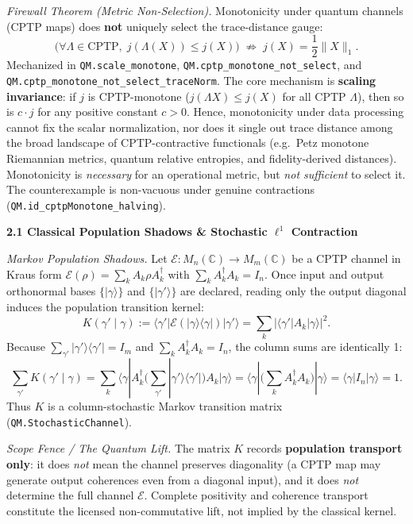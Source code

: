 \documentclass[
  11pt,
]{article}
\begin{document}
\emph{Firewall Theorem (Metric Non-Selection).} Monotonicity under quantum channels (CPTP maps) does \textbf{not} uniquely select the trace-distance gauge:
\[ \big(\forall \Lambda \in \mathrm{CPTP},\; j(\Lambda(X)) \le j(X)\big) \;\not\Longrightarrow\; j(X) = \frac{1}{2}\|X\|_1. \]
Mechanized in \texttt{QM.scale\_monotone}, \texttt{QM.cptp\_monotone\_not\_select}, and \texttt{QM.cptp\_monotone\_not\_select\_traceNorm}. The core mechanism is \textbf{scaling invariance}: if \(j\) is CPTP-monotone (\(j(\Lambda X) \le j(X)\) for all CPTP \(\Lambda\)), then so is \(c \cdot j\) for any positive constant \(c > 0\). Hence, monotonicity under data processing cannot fix the scalar normalization, nor does it single out trace distance among the broad landscape of CPTP-contractive functionals (e.g.~Petz monotone Riemannian metrics, quantum relative entropies, and fidelity-derived distances). Monotonicity is \emph{necessary} for an operational metric, but \emph{not sufficient} to select it. The counterexample is non-vacuous under genuine contractions (\texttt{QM.id\_cptpMonotone\_halving}).

\textbf{2.1 Classical Population Shadows \& Stochastic \(\ell^1\) Contraction}

\emph{Markov Population Shadows.} Let \(\mathcal{E}: M_n(\mathbb{C}) \to M_m(\mathbb{C})\) be a CPTP channel in Kraus form \(\mathcal{E}(\rho) = \sum_k A_k \rho A_k^\dagger\) with \(\sum_k A_k^\dagger A_k = I_n\). Once input and output orthonormal bases \(\{|\gamma\rangle\}\) and \(\{|\gamma'\rangle\}\) are declared, reading only the output diagonal induces the population transition kernel:
\[ K(\gamma' \mid \gamma) := \langle\gamma'|\mathcal{E}(|\gamma\rangle\langle\gamma|)|\gamma'\rangle = \sum_k |\langle\gamma'|A_k|\gamma\rangle|^2. \]
Because \(\sum_{\gamma'} |\gamma'\rangle\langle\gamma'| = I_m\) and \(\sum_k A_k^\dagger A_k = I_n\), the column sums are identically 1:
\[ \sum_{\gamma'} K(\gamma' \mid \gamma) = \sum_k \langle\gamma|A_k^\dagger \Big(\sum_{\gamma'} |\gamma'\rangle\langle\gamma'|\Big) A_k|\gamma\rangle = \langle\gamma|\Big(\sum_k A_k^\dagger A_k\Big)|\gamma\rangle = \langle\gamma|I_n|\gamma\rangle = 1. \]
Thus \(K\) is a column-stochastic Markov transition matrix (\texttt{QM.StochasticChannel}).

\emph{Scope Fence / The Quantum Lift.} The matrix \(K\) records \textbf{population transport only}: it does \emph{not} mean the channel preserves diagonality (a CPTP map may generate output coherences even from a diagonal input), and it does \emph{not} determine the full channel \(\mathcal{E}\). Complete positivity and coherence transport constitute the licensed non-commutative lift, not implied by the classical kernel.
\end{document}
